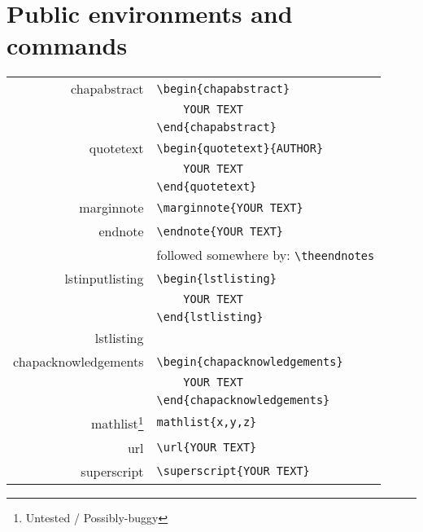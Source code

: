 \section{Public environments and commands}

\begin{center}
	\begin{longtable}{>{\ttfamily} r | >{\small}l}
		chapabstract			& \verb|\begin{chapabstract}|\\
								& \verb|	YOUR TEXT|\\
								& \verb|\end{chapabstract}|\\[6pt]
		quotetext				& \verb|\begin{quotetext}{AUTHOR}|\\
								& \verb|	YOUR TEXT|\\
								& \verb|\end{quotetext}|\\[6pt]
		marginnote				& \verb|\marginnote{YOUR TEXT}|\\[6pt]
		endnote					& \verb|\endnote{YOUR TEXT}|\\
								& followed somewhere by: \verb|\theendnotes|\\[6pt]
		lstinputlisting			& \verb|\begin{lstlisting}|\\
								& \verb|	YOUR TEXT|\\
								& \verb|\end{lstlisting}|\\[6pt]
		lstlisting				& \verb||\\[6pt]
		chapacknowledgements	& \verb|\begin{chapacknowledgements}|\\
								& \verb|	YOUR TEXT|\\
								& \verb|\end{chapacknowledgements}|\\[6pt]
		mathlist\footnote{Untested / Possibly-buggy}		& \verb|mathlist{x,y,z}|\\[6pt]
		url						& \verb|\url{YOUR TEXT}|\\[6pt]
		superscript				& \verb|\superscript{YOUR TEXT}|\\[6pt]
	\end{longtable}
\end{center}


